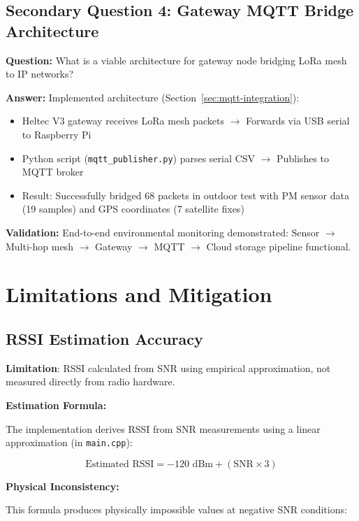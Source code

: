 \subsection{Secondary Question 4: Gateway MQTT Bridge Architecture}

\textbf{Question:} What is a viable architecture for gateway node bridging LoRa mesh to IP networks?

\textbf{Answer:} Implemented architecture (Section~\ref{sec:mqtt-integration}):

\begin{itemize}
\item Heltec V3 gateway receives LoRa mesh packets $\rightarrow$ Forwards via USB serial to Raspberry Pi
\item Python script (\texttt{mqtt\_publisher.py}) parses serial CSV $\rightarrow$ Publishes to MQTT broker
\item Result: Successfully bridged 68 packets in outdoor test with PM sensor data (19 samples) and GPS coordinates (7 satellite fixes)
\end{itemize}

\textbf{Validation:} End-to-end environmental monitoring demonstrated: Sensor $\rightarrow$ Multi-hop mesh $\rightarrow$ Gateway $\rightarrow$ MQTT $\rightarrow$ Cloud storage pipeline functional.

\section{Limitations and Mitigation}
\label{sec:limitations}

\subsection{RSSI Estimation Accuracy}

\textbf{Limitation}: RSSI calculated from SNR using empirical approximation, not measured directly from radio hardware.

\textbf{Estimation Formula:}

The implementation derives RSSI from SNR measurements using a linear approximation (in \texttt{main.cpp}):

\begin{equation}
\text{Estimated RSSI} = -120 \text{ dBm} + (\text{SNR} \times 3)
\end{equation}

\textbf{Physical Inconsistency:}

This formula produces physically impossible values at negative SNR conditions:


